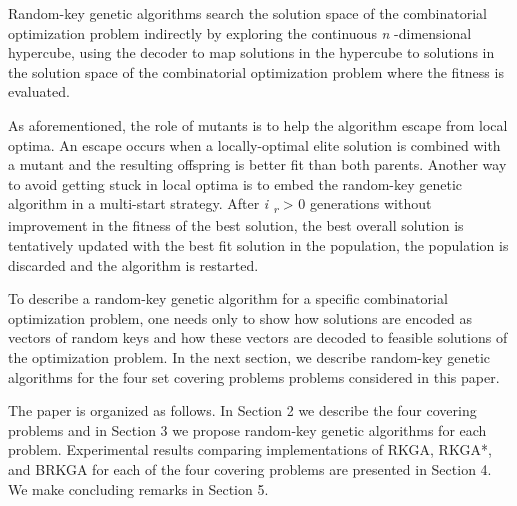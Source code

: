 \begin{multicols}{2}
\par{}Random-\allowbreak{}key genetic algorithms search the solution space of the combinatorial optimization problem indirectly by exploring the continuous \textit{n} -\allowbreak{}dimensional hypercube,\allowbreak{} using the decoder to map solutions in the hypercube to solutions in the solution space of the combinatorial optimization problem where the fitness is evaluated.\allowbreak{}\par{}As aforementioned,\allowbreak{} the role of mutants is to help the algorithm escape from local optima.\allowbreak{} An escape occurs when a locally-\allowbreak{}optimal elite solution is combined with a mutant and the resulting offspring is better fit than both parents.\allowbreak{} Another way to avoid getting stuck in local optima is to embed the random-\allowbreak{}key genetic algorithm in a multi-\allowbreak{}start strategy.\allowbreak{} After \textit{i \textsubscript{r}} > 0 generations without improvement in the fitness of the best solution,\allowbreak{} the best overall solution is tentatively updated with the best fit solution in the population,\allowbreak{} the population is discarded and the algorithm is restarted.\allowbreak{}\par{}To describe a random-\allowbreak{}key genetic algorithm for a specific combinatorial optimization problem,\allowbreak{} one needs only to show how solutions are encoded as vectors of random keys and how these vectors are decoded to feasible solutions of the optimization problem.\allowbreak{} In the next section,\allowbreak{} we describe random-\allowbreak{}key genetic algorithms for the four set covering problems problems considered in this paper.\allowbreak{}\par{}The paper is organized as follows.\allowbreak{} In Section 2 we describe the four covering problems and in Section 3 we propose random-\allowbreak{}key genetic algorithms for each problem.\allowbreak{} Experimental results comparing implementations of RKGA,\allowbreak{} RKGA*\allowbreak{},\allowbreak{} and BRKGA for each of the four covering problems are presented in Section 4.\allowbreak{} We make concluding remarks in Section 5.\allowbreak{} 

\end{multicols}
